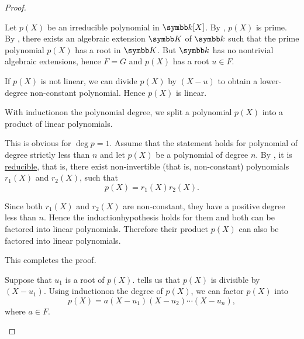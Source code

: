\begin{proof}\mbox{}
  \begin{description}
     Let \( p(X) \) be an irreducible polynomial in \( \Bk[X] \). By , \( p(X) \) is prime. By , there exists an algebraic extension \( \BK \) of \( \Bk \) such that the prime polynomial \( p(X) \) has a root in \( \BK \). But \( \Bk \) has no nontrivial algebraic extensions, hence \( F = G \) and \( p(X) \) has a root \( u \in F \).

    If \( p(X) \) is not linear\LEM, we can divide \( p(X) \) by \( (X - u) \) to obtain a lower-degree non-constant polynomial. Hence \( p(X) \) is linear.

     With induction\IND on the polynomial degree, we split a polynomial \( p(X) \) into a product of linear polynomials.

    This is obvious for \( \deg p = 1 \). Assume that the statement holds for polynomial of degree strictly less than \( n \) and let \( p(X) \) be a polynomial of degree \( n \). By , it is \hyperref[def:irreducible_ring_element]{reducible}, that is, there exist non-invertible (that is, non-constant) polynomials \( r_1(X) \) and \( r_2(X) \), such that
    \begin{equation*}
      p(X) = r_1(X) r_2(X).
    \end{equation*}

    Since both \( r_1(X) \) and \( r_2(X) \) are non-constant, they have a positive degree less than \( n \). Hence the induction\IND hypothesis holds for them and both can be factored into linear polynomials. Therefore their product \( p(X) \) can also be factored into linear polynomials.

    This completes the proof.

     Suppose that \( u_1 \) is a root of \( p(X) \).  tells us that \( p(X) \) is divisible by \( (X - u_1) \). Using induction\IND on the degree of \( p(X) \), we can factor \( p(X) \) into
    \begin{equation*}
      p(X) = a (X - u_1) (X - u_2) \cdots (X - u_n),
    \end{equation*}
    where \( a \in F \).


\end{description}
\end{proof}
